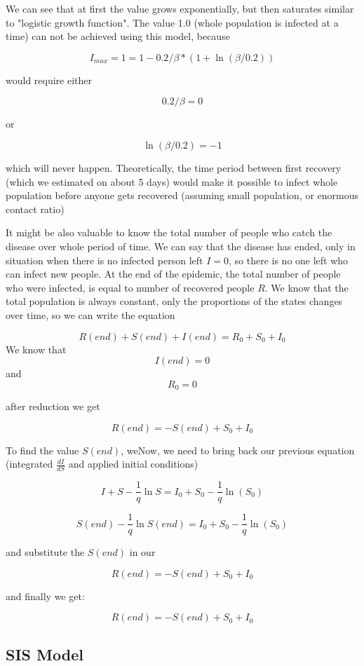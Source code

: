 \documentclass[nostrict]{szablonPG}
\begin{document}
We can see that at first the value grows exponentially, but then saturates similar to "logistic growth function". The value 1.0 (whole population is infected at a time) can not be achieved using this model, because

\[I_{max} = 1 = 1 - 0.2/\beta * (1 + \ln(\beta/0.2))\]

would require either 

\[0.2/\beta = 0\]

or 

\[\ln(\beta/0.2) = -1\]

which will never happen. 
Theoretically, the time period between first recovery (which we estimated on about 5 days) would make it possible to infect whole population before anyone gets recovered (assuming small population, or enormous contact ratio)

It might be also valuable to know the total number of people who catch the disease over whole period of time.
We can say that the disease has ended, only in situation when there is no infected person left $I = 0$, so there is no one left who can infect new people.
At the end of the epidemic, the total number of people who were infected, is equal to number of recovered people $R$. 
We know that the total population is always constant, only the proportions of the states changes over time, so we can write the equation

\[R(end) + S(end) + I(end) = R_0 + S_0 + I_0\]
We know that 
\[I(end) = 0\] and \[R_0 = 0\]

after reduction we get

\[R(end) = -S(end) + S_0 + I_0\]

To find the value $S(end)$, weNow, we need to bring back our previous equation (integrated $\frac{dI}{dS}$ and applied initial conditions)

\[I + S - \frac{1}{q} \ln{S} = I_0 + S_0 - \frac{1}{q} \ln(S_0)\]

\[S(end) - \frac{1}{q} \ln{S(end)} = I_0 + S_0 - \frac{1}{q} \ln(S_0)\]

and substitute the $S(end)$ in our

\[R(end) = -S(end) + S_0 + I_0\]

and finally we get:

\[R(end) = -S(end) + S_0 + I_0\]


\subsection{SIS Model}
\end{document}
